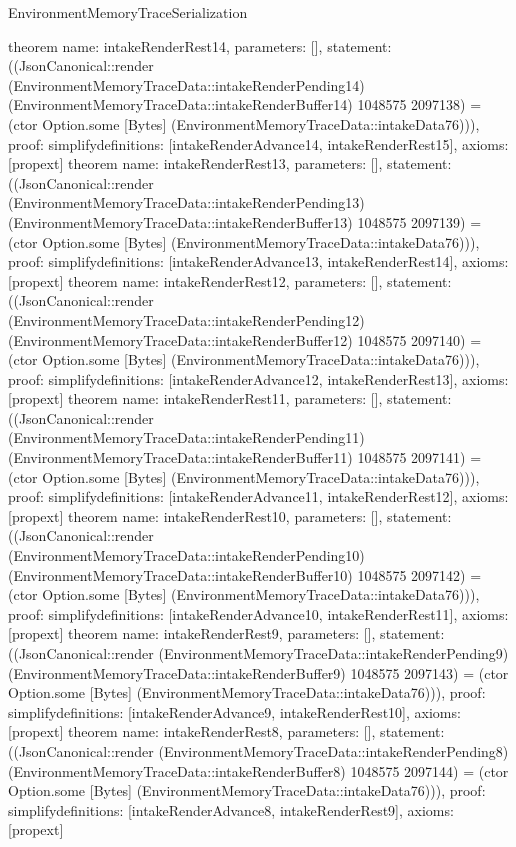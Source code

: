\begin{lexlean}{EnvironmentMemoryTraceSerialization}
\begin{semanticmodule}
{}
theorem{
 name: intakeRenderRest14, parameters: [],
 statement: ((JsonCanonical::render (EnvironmentMemoryTraceData::intakeRenderPending14) (EnvironmentMemoryTraceData::intakeRenderBuffer14) 1048575 2097138) = (ctor Option.some [Bytes] (EnvironmentMemoryTraceData::intakeData76))), proof: simplify{definitions: [intakeRenderAdvance14, intakeRenderRest15]}, axioms: [propext]
}
theorem{
 name: intakeRenderRest13, parameters: [],
 statement: ((JsonCanonical::render (EnvironmentMemoryTraceData::intakeRenderPending13) (EnvironmentMemoryTraceData::intakeRenderBuffer13) 1048575 2097139) = (ctor Option.some [Bytes] (EnvironmentMemoryTraceData::intakeData76))), proof: simplify{definitions: [intakeRenderAdvance13, intakeRenderRest14]}, axioms: [propext]
}
theorem{
 name: intakeRenderRest12, parameters: [],
 statement: ((JsonCanonical::render (EnvironmentMemoryTraceData::intakeRenderPending12) (EnvironmentMemoryTraceData::intakeRenderBuffer12) 1048575 2097140) = (ctor Option.some [Bytes] (EnvironmentMemoryTraceData::intakeData76))), proof: simplify{definitions: [intakeRenderAdvance12, intakeRenderRest13]}, axioms: [propext]
}
theorem{
 name: intakeRenderRest11, parameters: [],
 statement: ((JsonCanonical::render (EnvironmentMemoryTraceData::intakeRenderPending11) (EnvironmentMemoryTraceData::intakeRenderBuffer11) 1048575 2097141) = (ctor Option.some [Bytes] (EnvironmentMemoryTraceData::intakeData76))), proof: simplify{definitions: [intakeRenderAdvance11, intakeRenderRest12]}, axioms: [propext]
}
theorem{
 name: intakeRenderRest10, parameters: [],
 statement: ((JsonCanonical::render (EnvironmentMemoryTraceData::intakeRenderPending10) (EnvironmentMemoryTraceData::intakeRenderBuffer10) 1048575 2097142) = (ctor Option.some [Bytes] (EnvironmentMemoryTraceData::intakeData76))), proof: simplify{definitions: [intakeRenderAdvance10, intakeRenderRest11]}, axioms: [propext]
}
theorem{
 name: intakeRenderRest9, parameters: [],
 statement: ((JsonCanonical::render (EnvironmentMemoryTraceData::intakeRenderPending9) (EnvironmentMemoryTraceData::intakeRenderBuffer9) 1048575 2097143) = (ctor Option.some [Bytes] (EnvironmentMemoryTraceData::intakeData76))), proof: simplify{definitions: [intakeRenderAdvance9, intakeRenderRest10]}, axioms: [propext]
}
theorem{
 name: intakeRenderRest8, parameters: [],
 statement: ((JsonCanonical::render (EnvironmentMemoryTraceData::intakeRenderPending8) (EnvironmentMemoryTraceData::intakeRenderBuffer8) 1048575 2097144) = (ctor Option.some [Bytes] (EnvironmentMemoryTraceData::intakeData76))), proof: simplify{definitions: [intakeRenderAdvance8, intakeRenderRest9]}, axioms: [propext]
}
\end{semanticmodule}
\end{lexlean}
